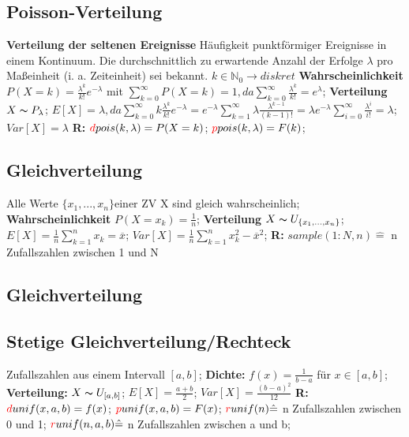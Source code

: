 \subsection{Poisson-Verteilung}
\textbf{Verteilung der seltenen Ereignisse} Häufigkeit punktförmiger Ereignisse in einem Kontinuum. Die durchschnittlich zu erwartende Anzahl der Erfolge $\lambda$ pro Maßeinheit (i. a. Zeiteinheit) sei bekannt. $k \in \mathbb{N}_{0} \rightarrow diskret$
\textbf{Wahrscheinlichkeit}$P (X = k) = \frac{\lambda^k}{k!}e^{-\lambda}$ mit $ \sum_{k=0}^{\infty} P(X=k) = 1, da \sum_{k=0}^{\infty} \frac{\lambda^k}{k!} = e^{\lambda}$; 
\textbf{Verteilung} $X \thicksim P_{\lambda}$; 
$E[X] = \lambda, da \sum_{k=0}^{\infty} k\frac{\lambda^k}{k!} e^{-\lambda} = e^{-\lambda}\sum_{k=1}^{\infty}\lambda \frac{\lambda^{k-1}}{(k-1)!} = \lambda e^{-\lambda} \sum_{i=0}^{\infty} \frac{\lambda^i}{i!} = \lambda$; 
$Var[X] = \lambda$ 
\textbf{R:} 
$\textcolor{red}{d}pois(k,\lambda)=P(X=k)$; 
$\textcolor{red}{p}pois(k,\lambda)=F(k)$; 
\subsection{Gleichverteilung}
Alle Werte $\{x_{1},...,x_{n}\}$einer ZV X sind gleich wahrscheinlich; 
\textbf{Wahrscheinlichkeit} 
$P(X=x_{k}) = \frac{1}{n}$; 
\textbf{Verteilung} 
$X \thicksim U_{\{x_{1}, ..., x_{n}\}}$; 
$E[X] = \frac{1}{n} \sum_{k=1}^{n} x_{k} = \overline{x}$; 
$Var[X] = \frac{1}{n} \sum_{k=1}^{n} x_{k}^2 - \overline{x}^2$; 
\textbf{R:} 
$sample(1:N,n) \hat{=}$ n Zufallszahlen zwischen 1 und N
\subsection{Gleichverteilung}
\subsection{Stetige Gleichverteilung/Rechteck}
Zufallszahlen aus einem Intervall $[a,b]$; 
\textbf{Dichte:} 
$f(x) = \frac{1}{b-a}$ für $x \in [a,b]$; 
\textbf{Verteilung:} 
$X \thicksim U_{[a,b]}$; 
$E[X] = \frac{a+b}{2}$; 
$Var[X] = \frac{(b-a)^2}{12}$
\textbf{R:} 
$\textcolor{red}{d}unif(x,a,b)=f(x)$; 
$\textcolor{red}{p}unif(x,a,b)=F(x)$; 
$\textcolor{red}{r}unif(n) \hat{=}$ n Zufallszahlen zwischen 0 und 1; 
$\textcolor{red}{r}unif(n, a, b) \hat{=}$ n Zufallszahlen zwischen a und b; 
